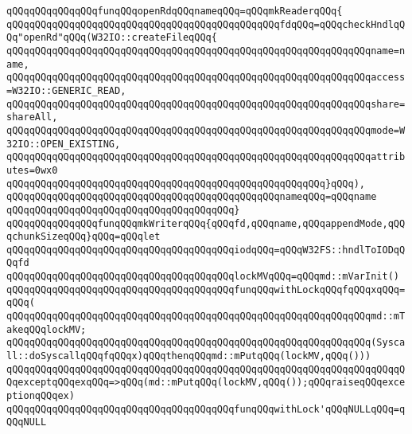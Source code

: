 \newline
\verb|qQQqqQQqqQQqqQQqfunqQQqopenRdqQQqnameqQQq=qQQqmkReaderqQQq{|\newline
\verb|qQQqqQQqqQQqqQQqqQQqqQQqqQQqqQQqqQQqqQQqqQQqqQQqfdqQQq=qQQqcheckHndlqQQq"openRd"qQQq(W32IO::createFileqQQq{|\newline
\verb|qQQqqQQqqQQqqQQqqQQqqQQqqQQqqQQqqQQqqQQqqQQqqQQqqQQqqQQqqQQqqQQqname=name,|\newline
\verb|qQQqqQQqqQQqqQQqqQQqqQQqqQQqqQQqqQQqqQQqqQQqqQQqqQQqqQQqqQQqqQQqaccess=W32IO::GENERIC_READ,|\newline
\verb|qQQqqQQqqQQqqQQqqQQqqQQqqQQqqQQqqQQqqQQqqQQqqQQqqQQqqQQqqQQqqQQqshare=shareAll,|\newline
\verb|qQQqqQQqqQQqqQQqqQQqqQQqqQQqqQQqqQQqqQQqqQQqqQQqqQQqqQQqqQQqqQQqmode=W32IO::OPEN_EXISTING,|\newline
\verb|qQQqqQQqqQQqqQQqqQQqqQQqqQQqqQQqqQQqqQQqqQQqqQQqqQQqqQQqqQQqqQQqattributes=0wx0|\newline
\verb|qQQqqQQqqQQqqQQqqQQqqQQqqQQqqQQqqQQqqQQqqQQqqQQqqQQqqQQq}qQQq),|\newline
\verb|qQQqqQQqqQQqqQQqqQQqqQQqqQQqqQQqqQQqqQQqqQQqqQQqnameqQQq=qQQqname|\newline
\verb|qQQqqQQqqQQqqQQqqQQqqQQqqQQqqQQqqQQqqQQq}|\newline
\newline
\verb|qQQqqQQqqQQqqQQqfunqQQqmkWriterqQQq{qQQqfd,qQQqname,qQQqappendMode,qQQqchunkSizeqQQq}qQQq=qQQqlet|\newline
\verb|qQQqqQQqqQQqqQQqqQQqqQQqqQQqqQQqqQQqqQQqiodqQQq=qQQqW32FS::hndlToIODqQQqfd|\newline
\verb|qQQqqQQqqQQqqQQqqQQqqQQqqQQqqQQqqQQqqQQqlockMVqQQq=qQQqmd::mVarInit()|\newline
\verb|qQQqqQQqqQQqqQQqqQQqqQQqqQQqqQQqqQQqqQQqfunqQQqwithLockqQQqfqQQqxqQQq=qQQq(|\newline
\verb|qQQqqQQqqQQqqQQqqQQqqQQqqQQqqQQqqQQqqQQqqQQqqQQqqQQqqQQqqQQqqQQqmd::mTakeqQQqlockMV;|\newline
\verb|qQQqqQQqqQQqqQQqqQQqqQQqqQQqqQQqqQQqqQQqqQQqqQQqqQQqqQQqqQQqqQQq(Syscall::doSyscallqQQqfqQQqx)qQQqthenqQQqmd::mPutqQQq(lockMV,qQQq()))|\newline
\verb|qQQqqQQqqQQqqQQqqQQqqQQqqQQqqQQqqQQqqQQqqQQqqQQqqQQqqQQqqQQqqQQqqQQqqQQqexceptqQQqexqQQq=>qQQq(md::mPutqQQq(lockMV,qQQq());qQQqraiseqQQqexceptionqQQqex)|\newline
\verb|qQQqqQQqqQQqqQQqqQQqqQQqqQQqqQQqqQQqqQQqfunqQQqwithLock'qQQqNULLqQQq=qQQqNULL|\newline
